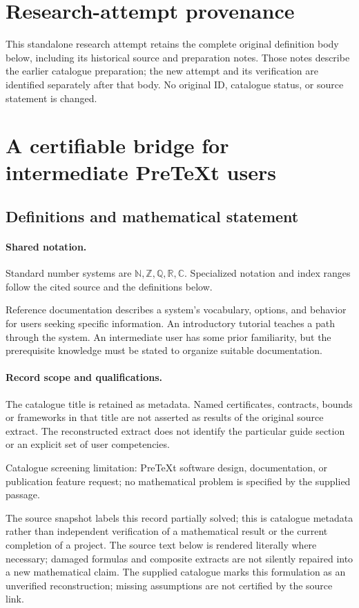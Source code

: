 \documentclass[11pt]{article}
\begin{document}
\section*{Research-attempt provenance}
This standalone research attempt retains the complete original definition body below,
including its historical source and preparation notes. Those notes describe the
earlier catalogue preparation; the new attempt and its verification are identified
separately after that body. No original ID, catalogue status, or source statement is changed.

\section{A certifiable bridge for intermediate PreTeXt users}\label{statement}

\subsection{Definitions and mathematical statement}

\paragraph{Shared notation.}Standard number systems are $\mathbb N,\mathbb Z,\mathbb Q,\mathbb R,\mathbb C$. Specialized notation and index ranges follow the cited source and the definitions below.


Reference documentation describes a system's vocabulary, options, and behavior for users seeking specific information. An introductory tutorial teaches a path through the system. An intermediate user has some prior familiarity, but the prerequisite knowledge must be stated to organize suitable documentation.
\paragraph{Record scope and qualifications.}
The catalogue title is retained as metadata. Named certificates, contracts, bounds or frameworks in that title are not asserted as results of the original source extract.
The reconstructed extract does not identify the particular guide section or an explicit set of user competencies.

Catalogue screening limitation: PreTeXt software design, documentation, or publication feature request; no mathematical problem is specified by the supplied passage.

The source snapshot labels this record partially solved; this is catalogue metadata rather than independent verification of a mathematical result or the current completion of a project.
The source text below is rendered literally where necessary; damaged formulas and composite extracts are not silently repaired into a new mathematical claim.
The supplied catalogue marks this formulation as an unverified reconstruction; missing assumptions are not certified by the source link.
\end{document}
